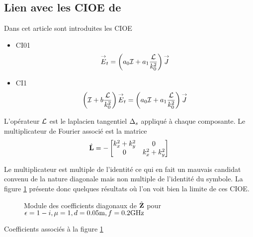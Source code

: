   \subsection{Lien avec les CIOE de \cite{stupfel_implementation_2015}}

    Dans cet article sont introduites les CIOE
    \begin{itemize}
      \item CI01
        \begin{equation}
          {\overset{\rightarrow}{E}}_t = \left(a_0{\mathcal{I}} + a_1\dfrac{\mathcal{L}}{k_0^2}\right){\overset{\rightarrow}{J}}
        \end{equation}
      \item CI1
        \begin{equation}
          \left({\mathcal{I}} + b\dfrac{\mathcal{L}}{k_0^2} \right){\overset{\rightarrow}{E}}_t = \left(a_0{\mathcal{I}} + a_1\dfrac{\mathcal{L}}{k_0^2}\right){\overset{\rightarrow}{J}}
        \end{equation}
    \end{itemize}

    L'opérateur \(\mathcal{L}\) est le laplacien tangentiel \(\Delta_s\) appliqué à chaque composante. Le multiplicateur de Fourier associé est la matrice
    \begin{equation}
      \hat{\mathbf{L}}  = -
      \begin{bmatrix}
        k_x^2 + k_y^2 & 0
        \\
        0 & k_x^2 + k_y^2
      \end{bmatrix}
    \end{equation}

    Le multiplicateur est multiple de l'identité ce qui en fait un mauvais candidat convenu de la nature diagonale mais non multiple de l’identité du symbole. La figure \ref{fig:imp_fourier:plan:stupfel:hoibc} présente donc quelques résultats où l'on voit bien la limite de ces CIOE.
    \begin{figure}[!hbt]
      \centering
      
      \caption[CIOE sur empilement de B.~Stupfel p.~1661]{Module des coefficients diagonaux de \(\hat{\mathbf{Z}}\) pour \(\epsilon = 1-i, \mu = 1, d=0.05\text{m}, f=0.2\text{GHz}\)}
      \label{fig:imp_fourier:plan:stupfel:hoibc}
    \end{figure}
    \begin{table}[!hbt]
      \centering

      \caption{Coefficients associés à la figure \ref{fig:imp_fourier:plan:stupfel:hoibc}}
      \label{tab:imp_fourier:plan:stupfel:hoibc}
    \end{table}
    
